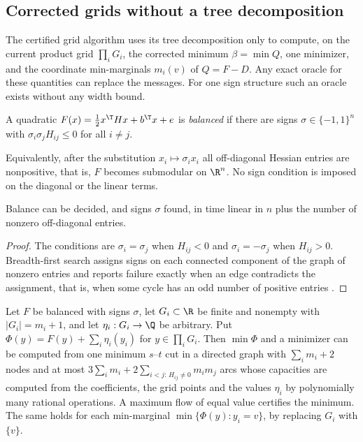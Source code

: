 \subsection{Corrected grids without a tree decomposition}\label{sec:balanced}

The certified grid algorithm uses its tree decomposition only to compute, on the current product
grid $\prod_iG_i$, the corrected minimum $\beta=\min Q$, one minimizer, and the coordinate
min-marginals $m_i(v)$ of $Q=F-D$. Any exact oracle for these quantities can replace the
messages. For one sign structure such an oracle exists without any width bound.

\begin{definition}
A quadratic $F(x)=\tfrac12x^{\T}Hx+b^{\T}x+e$ is \emph{balanced} if there are signs
$\sigma\in\{-1,1\}^n$ with $\sigma_i\sigma_jH_{ij}\le0$ for all $i\neq j$.
\end{definition}

Equivalently, after the substitution $x_i\mapsto\sigma_ix_i$ all off-diagonal Hessian entries
are nonpositive, that is, $F$ becomes submodular on $\R^n$. No sign condition is imposed on the
diagonal or the linear terms.

\begin{lemma}\label{lem:balance}
Balance can be decided, and signs $\sigma$ found, in time linear in $n$ plus the number of
nonzero off-diagonal entries.
\end{lemma}

\begin{proof}
The conditions are $\sigma_i=\sigma_j$ when $H_{ij}<0$ and $\sigma_i=-\sigma_j$ when $H_{ij}>0$.
Breadth-first search assigns signs on each connected component of the graph of nonzero entries
and reports failure exactly when an edge contradicts the assignment, that is, when some cycle has
an odd number of positive entries \cite{Harary1953}.
\end{proof}

\begin{lemma}\label{lem:chaincut}
Let $F$ be balanced with signs $\sigma$, let $G_i\subset\R$ be finite and nonempty with
$|G_i|=m_i+1$, and let $\eta_i:G_i\to\Q$ be arbitrary. Put
$\Phi(y)=F(y)+\sum_i\eta_i(y_i)$ for $y\in\prod_iG_i$. Then $\min\Phi$ and a minimizer can be
computed from one minimum $s$--$t$ cut in a directed graph with $\sum_im_i+2$ nodes and at most
$3\sum_im_i+2\sum_{i<j:\,H_{ij}\neq0}m_im_j$ arcs whose capacities are computed from the
coefficients, the grid points and the values $\eta_i$ by polynomially many rational operations.
A maximum flow of equal value certifies the minimum. The same
holds for each min-marginal $\min\{\Phi(y):y_i=v\}$, by replacing $G_i$ with $\{v\}$.
\end{lemma}

